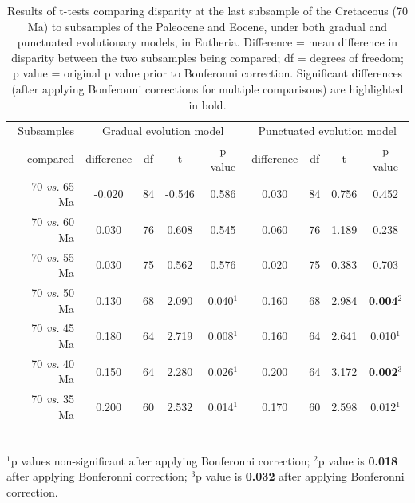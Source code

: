 \documentclass[12pt,letterpaper]{article}
\begin{document}
\begin{table}[ht]
\caption{Results of t-tests comparing disparity at the last subsample of the Cretaceous (70 Ma) to subsamples of the Paleocene and Eocene, under both gradual and punctuated evolutionary models, in Eutheria. Difference = mean difference in disparity between the two subsamples being compared; df = degrees of freedom; p value = original p value prior to Bonferonni correction. Significant differences (after applying Bonferonni corrections for multiple comparisons) are highlighted in bold.}
\label{tab:Tab_beck}
\centering
\begin{tabular}{r|cccc|cccc}
  \hline
  Subsamples & \multicolumn{4}{c|}{Gradual evolution model} & \multicolumn{4}{c}{Punctuated evolution model} \\
  compared & difference & df & t & p value & difference & df & t & p value \\ 
  \hline
  70 \textit{vs.} 65 Ma & -0.020 & 84 & -0.546 & 0.586 & 0.030 & 84 & 0.756 & 0.452 \\ 
  70 \textit{vs.} 60 Ma &  0.030 & 76 & 0.608 & 0.545 & 0.060 & 76 & 1.189 & 0.238 \\ 
  70 \textit{vs.} 55 Ma &  0.030 & 75 & 0.562 & 0.576 & 0.020 & 75 & 0.383 & 0.703 \\ 
  70 \textit{vs.} 50 Ma &  0.130 & 68 & 2.090 & 0.040$^1$ & 0.160 & 68 & 2.984 & \textbf{0.004}$^2$ \\ 
  70 \textit{vs.} 45 Ma &  0.180 & 64 & 2.719 & 0.008$^1$ & 0.160 & 64 & 2.641 & 0.010$^1$ \\ 
  70 \textit{vs.} 40 Ma &  0.150 & 64 & 2.280 & 0.026$^1$ & 0.200 & 64 & 3.172 & \textbf{0.002}$^3$ \\ 
  70 \textit{vs.} 35 Ma &  0.200 & 60 & 2.532 & 0.014$^1$ & 0.170 & 60 & 2.598 & 0.012$^1$ \\ 
   \hline
\end{tabular} \\
   $^1$p values non-significant after applying Bonferonni correction;
   $^2$p value is \textbf{0.018} after applying Bonferonni correction;
   $^3$p value is \textbf{0.032} after applying Bonferonni correction.
\end{table}
\end{document}
